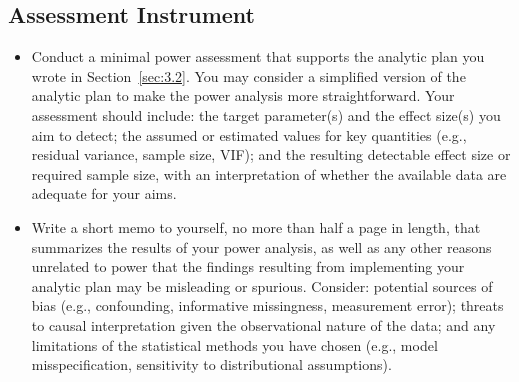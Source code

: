 \subsection{Assessment Instrument}

\begin{itemize}
    \item Conduct a minimal power assessment that supports the analytic plan you wrote in Section~\ref{sec:3.2}. You may consider a simplified version of the analytic plan to make the power analysis more straightforward. Your assessment should include: the target parameter(s) and the effect size(s) you aim to detect; the assumed or estimated values for key quantities (e.g., residual variance, sample size, VIF); and the resulting detectable effect size or required sample size, with an interpretation of whether the available data are adequate for your aims.
    \item Write a short memo to yourself, no more than half a page in length, that summarizes the results of your power analysis, as well as any other reasons unrelated to power that the findings resulting from implementing your analytic plan may be misleading or spurious. Consider: potential sources of bias (e.g., confounding, informative missingness, measurement error); threats to causal interpretation given the observational nature of the data; and any limitations of the statistical methods you have chosen (e.g., model misspecification, sensitivity to distributional assumptions).
\end{itemize}

